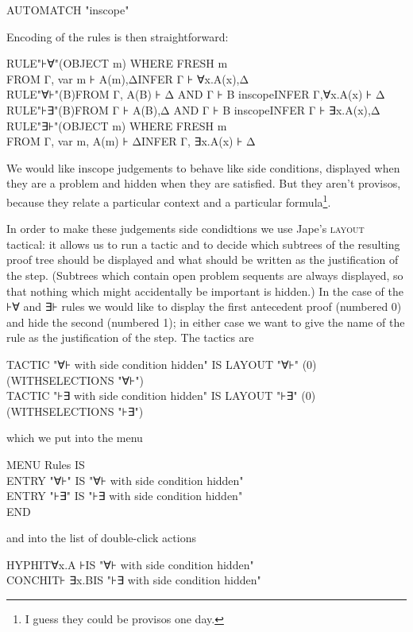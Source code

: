 \documentclass[11pt]{book}
\newcommand{\tab}{\hspace{5mm}}
\begin{document}
AUTOMATCH "inscope"


Encoding of the rules is then straightforward:

RULE\tab "⊦∀"(OBJECT m) WHERE FRESH m\\
\tab \tab FROM Γ, var m ⊦ A(m),Δ\tab INFER Γ ⊦ ∀x.A(x),Δ\\
RULE\tab "∀⊦"(B)\tab FROM Γ, A(B) ⊦ Δ AND 
Γ ⊦ B inscope\tab INFER Γ,∀x.A(x) ⊦ Δ\\
RULE\tab "⊦∃"(B)\tab FROM Γ ⊦ A(B),Δ 
AND Γ ⊦ B inscope\tab INFER Γ ⊦ ∃x.A(x),Δ\\
RULE\tab "∃⊦"(OBJECT m) WHERE FRESH m\\
\tab \tab FROM Γ, var m, A(m) ⊦ Δ\tab INFER Γ, ∃x.A(x) 
⊦ Δ


We would like inscope judgements to behave like side conditions, displayed when they are a problem and hidden when they are satisfied. But they aren't provisos, because they relate a particular context and a particular formula\footnote{I guess they could be provisos one day.}.


In order to make these judgements side condidtions we use Jape's \textsc{layout} tactical: it allows us to run a tactic and to decide which subtrees of the resulting proof tree should be displayed and what should be written as the justification of the step. (Subtrees which contain open problem sequents are always displayed, so that nothing which might accidentally be important is hidden.) In the case of the ⊦∀ and ∃⊦ rules we would like to display the first antecedent proof (numbered 0) and hide the second (numbered 1); in either case we want to give the name of the rule as the justification of the step. The tactics are

TACTIC "∀⊦ with side condition hidden" IS LAYOUT 
"∀⊦" (0) (WITHSELECTIONS "∀⊦")\\
TACTIC "⊦∃ with side condition hidden" 
IS LAYOUT "⊦∃" (0) (WITHSELECTIONS "⊦∃")


which we put into the menu

MENU Rules IS\\
\tab ENTRY "∀⊦" IS "∀⊦ with side condition 
hidden"\\
\tab ENTRY "⊦∃" IS "⊦∃ with 
side condition hidden"\\
END


and into the list of double-click actions

HYPHIT\tab ∀x.A ⊦\tab IS "∀⊦ with side condition hidden"\\
CONCHIT\tab ⊦ ∃x.B\tab IS "⊦∃ with side condition 
hidden"
\end{document}
